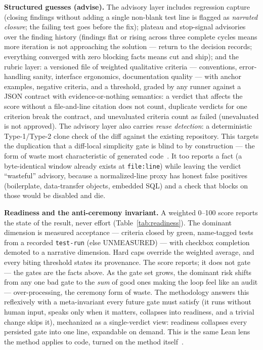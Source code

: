 \documentclass[11pt]{article}
\begin{document}
\textbf{Structured guesses (advise).} The advisory layer includes regression
capture (closing findings without adding a single non-blank test line is
flagged as \emph{narrated closure}; the failing test goes before the fix);
plateau and stop-signal advisories over the finding history (findings flat or
rising across three complete cycles means more iteration is not approaching
the solution --- return to the decision records; everything converged with
zero blocking facts means cut and ship); and the rubric layer: a versioned
file of weighted qualitative criteria --- conventions, error-handling sanity,
interface ergonomics, documentation quality --- with anchor examples, negative
criteria, and a threshold, graded by any runner against a JSON contract with
evidence-or-nothing semantics: a verdict that affects the score without a
file-and-line citation does not count, duplicate verdicts for one criterion
break the contract, and unevaluated criteria count as failed (unevaluated is
not approved). The advisory layer also carries \emph{reuse detection}: a
deterministic Type-1/Type-2 clone check of the diff against the existing
repository. This targets the duplication that a diff-local simplicity gate is
blind to by construction --- the form of waste most characteristic of generated
code~\cite{poppendieck2006lean,gitclear2026gap}. It too reports a fact (a
byte-identical window already exists at \texttt{file:line}) while leaving the
verdict ``wasteful'' advisory, because a normalized-line proxy has honest false
positives (boilerplate, data-transfer objects, embedded SQL) and a check that
blocks on those would be disabled and die.

\textbf{Readiness and the anti-ceremony invariant.} A weighted 0--100 score
reports the state of the result, never effort (Table~\ref{tab:readiness}). The
dominant dimension is measured acceptance --- criteria closed by green,
name-tagged tests from a recorded \texttt{test-run} (else UNMEASURED) --- with checkbox completion demoted to a narrative
dimension. Hard caps override the weighted average, and every biting threshold
states its provenance. The score reports; it does not gate --- the gates are
the facts above. As the gate set grows, the dominant risk shifts from any one
bad gate to the \emph{sum} of good ones making the loop feel like an audit ---
over-processing, the ceremony form of waste. The methodology answers this
reflexively with a meta-invariant every future gate must satisfy (it runs
without human input, speaks only when it matters, collapses into readiness, and
a trivial change skips it), mechanized as a single-verdict view: readiness
collapses every persisted gate into one line, expandable on demand. This is the
same Lean lens the method applies to code, turned on the method
itself~\cite{poppendieck2006lean}.
\end{document}
